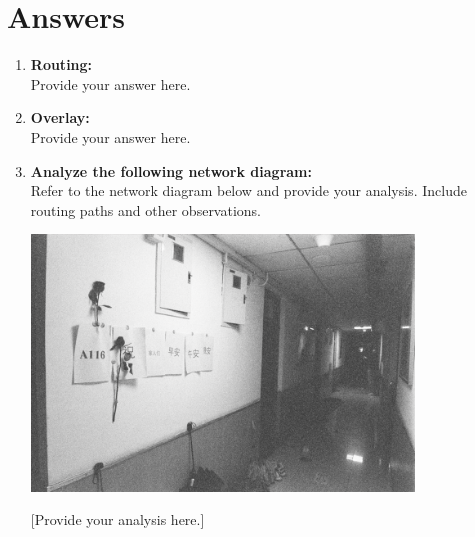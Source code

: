 \documentclass[a4paper,12pt]{article}
\begin{document}

\vspace{-0.1cm}

\section*{Answers}

\begin{enumerate}
    \item \textbf{Routing:} \\
    Provide your answer here.

    \item \textbf{Overlay:} \\
    Provide your answer here.

    \item \textbf{Analyze the following network diagram:} \\
    Refer to the network diagram below and provide your analysis. Include routing paths and other observations. \\
    \vspace{0.5cm}
    \begin{center}
        \includegraphics[width=0.8\textwidth]{images/example-network.png} %
    \end{center}
    \vspace{0.5cm}
    [Provide your analysis here.]


\end{enumerate}
\end{document}

